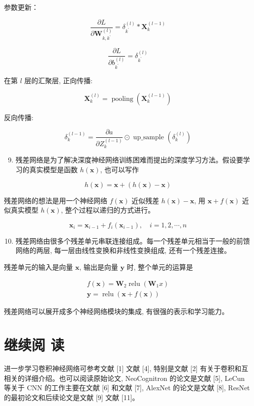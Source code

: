 \documentclass[10pt]{article}
\begin{document}
参数更新：

$$
\frac{\partial L}{\partial \boldsymbol{W}_{k, k^{\prime}}^{(l)}}=\delta_{k^{\prime}}^{(l)} * \boldsymbol{X}_{k}^{(l-1)}
$$

$$
\frac{\partial L}{\partial b_{k^{\prime}}^{(l)}}=\delta_{k^{\prime}}^{(l)}
$$

在第 $l$ 层的汇聚层, 正向传播:

$$
\boldsymbol{X}_{k}^{(l)}=\operatorname{pooling}\left(\boldsymbol{X}_{k}^{(l-1)}\right)
$$

反向传播:

$$
\delta_{k}^{(l-1)}=\frac{\partial a}{\partial Z_{k}^{(l-1)}} \odot \text { up_sample }\left(\delta_{k}^{(l)}\right)
$$

\begin{enumerate}
  \setcounter{enumi}{8}
  \item 残差网络是为了解决深度神经网络训练困难而提出的深度学习方法。假设要学习的真实模型是函数 $h(\boldsymbol{x})$, 也可以写作
\end{enumerate}

$$
h(\boldsymbol{x})=\boldsymbol{x}+(h(\boldsymbol{x})-\boldsymbol{x})
$$

残差网络的想法是用一个神经网络 $f(\boldsymbol{x})$ 近似残差 $h(\boldsymbol{x})-\boldsymbol{x}$, 用 $\boldsymbol{x}+f(\boldsymbol{x})$ 近似真实模型 $h(\boldsymbol{x})$, 整个过程以递归的方式进行。

$$
\boldsymbol{x}_{i}=\boldsymbol{x}_{i-1}+f_{i}\left(\boldsymbol{x}_{i-1}\right), \quad i=1,2, \cdots, n
$$

\begin{enumerate}
  \setcounter{enumi}{9}
  \item 残差网络由很多个残差单元串联连接组成。每一个残差单元相当于一般的前馈网络的两层, 每一层由线性变换和非线性变换组成, 还有一个残差连接。
\end{enumerate}

残差单元的输入是向量 $\boldsymbol{x}$, 输出是向量 $\boldsymbol{y}$ 时, 整个单元的运算是

$$
\begin{gathered}
f(\boldsymbol{x})=\boldsymbol{W}_{2} \operatorname{relu}\left(\boldsymbol{W}_{1} x\right) \\
\boldsymbol{y}=\operatorname{relu}(\boldsymbol{x}+f(\boldsymbol{x}))
\end{gathered}
$$

残差网络可以展开成多个神经网络模块的集成, 有很强的表示和学习能力。

\section*{继续阅 读}
进一步学习卷积神经网络可参考文献 [1] 文献 [4], 特别是文献 [2] 有关于卷积和互相关的详细介绍。也可以阅读原始论文, NeoCognitron 的论文是文献 [5], LeCun 等关于 CNN 的工作主要在文献 [6] 和文献 [7], AlexNet 的论文是文献 [8], ResNet 的最初论文和后续论文是文献 [9] 文献 [11]。
\end{document}
